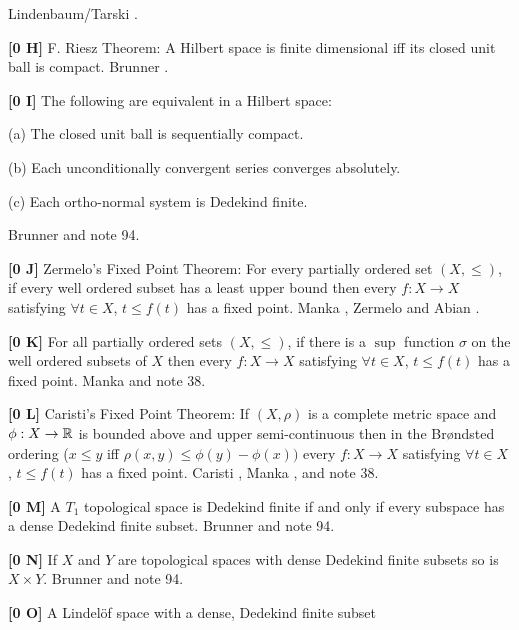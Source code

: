 \ac{Lindenbaum/Tarski} \cite{1926}.
\smallskip
\item{}{\bf [0 H]}  F. Riesz Theorem:  A Hilbert space is finite
dimensional iff its closed unit ball is compact. \ac{Brunner} \cite{1983b}.
\smallskip
\item{}{\bf [0 I]}  The following are equivalent in a  Hilbert  space:
\item\item{}{(a)} The closed unit  ball  is  sequentially compact.
\item\item{}{(b)} Each unconditionally convergent series converges
absolutely.
\item\item{}{(c)} Each ortho-normal system is Dedekind finite.
\item{} \ac{Brunner} \cite{1983b} and note 94.
\smallskip
\item{}{\bf [0 J]}  Zermelo's Fixed Point Theorem:  For every partially
ordered set $(X,\le)$, if every well ordered subset has a least
upper bound then every $f: X\rightarrow X$ satisfying $\forall t\in
X$, $t\le f(t)$ has a fixed point.  \ac{Manka} \cite{1988a}, \ac{Zermelo}
\cite{1908b} and \ac{Abian} \cite{1980}. 
\smallskip
\item{}{\bf [0 K]}  For all partially ordered sets $(X,\le)$, if there
is a $\sup$ function $\sigma$ on the well ordered subsets of $X$ then
every $f: X\rightarrow X$ satisfying $\forall t\in X$, $t\le f(t)$ has a
fixed point.  \ac{Manka} \cite{1988a} and note 38.
\smallskip
\item{}{\bf [0 L]}  Caristi's Fixed Point Theorem:  If $(X,\rho)$ is a
complete metric space and $\phi : X\rightarrow{\Bbb R}$ is bounded
above and upper semi-continuous then in the Br\o ndsted  ordering
($x\le y$ iff $\rho(x,y)\le\phi(y) - \phi(x))$ every $f: X\rightarrow X$
satisfying $\forall t\in X$, $t\le f(t)$ has a fixed point.
\ac{Caristi} \cite{1976}, \ac{Manka} \cite{1988a}, and note 38.
\smallskip
\item{}{\bf [0 M]} A $T_1$ topological space is Dedekind finite if and only
if every subspace has a dense Dedekind finite subset. \ac{Brunner}
\cite{1982d} and note 94.
\smallskip
\item{}{\bf [0 N]}  If $X$ and $Y$ are topological spaces with dense
Dedekind finite subsets so is $X\times Y$.  \ac{Brunner} \cite{1982d} and
note 94.
\smallskip
\item{}{\bf [0 O]}  A Lindel\"of space with a dense, Dedekind finite subset
